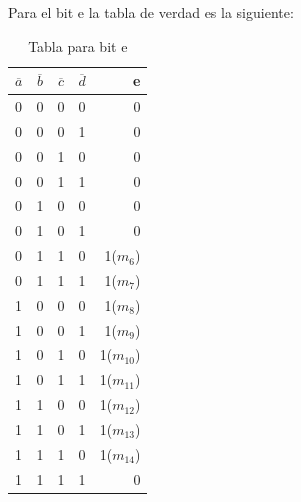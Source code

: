 Para el bit e la tabla de verdad es la siguiente:\\
\begin{table}[H]
	\begin{center}
		\caption{Tabla para bit e}
		\vspace{5mm}
		\begin{tabular}{l|c|c|c|r}
			\textbf{$\overline{a}$} & \textbf{$\overline{b}$} & \textbf{$\overline{c}$} & \textbf{$\overline{d}$} & \textbf{e}  \\
			\hline
			0                       & 0                       & 0                       & 0                       & 0           \\
			0                       & 0                       & 0                       & 1                       & 0           \\	
			0                       & 0                       & 1                       & 0                       & 0           \\
			0                       & 0                       & 1                       & 1                       & 0           \\
			0                       & 1                       & 0                       & 0                       & 0           \\
			0                       & 1                       & 0                       & 1                       & 0           \\	
			0                       & 1                       & 1                       & 0                       & 1($m_{6}$)  \\
			0                       & 1                       & 1                       & 1                       & 1($m_{7}$)  \\		
			1                       & 0                       & 0                       & 0                       & 1($m_{8}$)  \\
			1                       & 0                       & 0                       & 1                       & 1($m_{9}$)  \\	
			1                       & 0                       & 1                       & 0                       & 1($m_{10}$) \\
			1                       & 0                       & 1                       & 1                       & 1($m_{11}$) \\
			1                       & 1                       & 0                       & 0                       & 1($m_{12}$) \\
			1                       & 1                       & 0                       & 1                       & 1($m_{13}$) \\	
			1                       & 1                       & 1                       & 0                       & 1($m_{14}$) \\
			1                       & 1                       & 1                       & 1                       & 0           \\			
		\end{tabular}
	\end{center}
\end{table}
